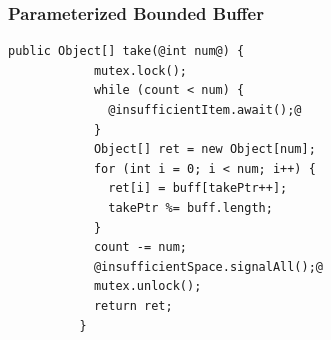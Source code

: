 \documentclass[mathserif,14pt,xcolor=table]{beamer}
\begin{document}
\begin{frame}[fragile]
    \frametitle{Parameterized Bounded Buffer}
    \begin{lstlisting}[style=base, gobble=4]
          public Object[] take(@int num@) {
            mutex.lock();
            while (count < num) {
              @insufficientItem.await();@
            }
            Object[] ret = new Object[num];
            for (int i = 0; i < num; i++) {
              ret[i] = buff[takePtr++];
              takePtr %= buff.length;
            }
            count -= num;
            @insufficientSpace.signalAll();@
            mutex.unlock();
            return ret;
          }
    \end{lstlisting}
\end{frame}

\end{document}
